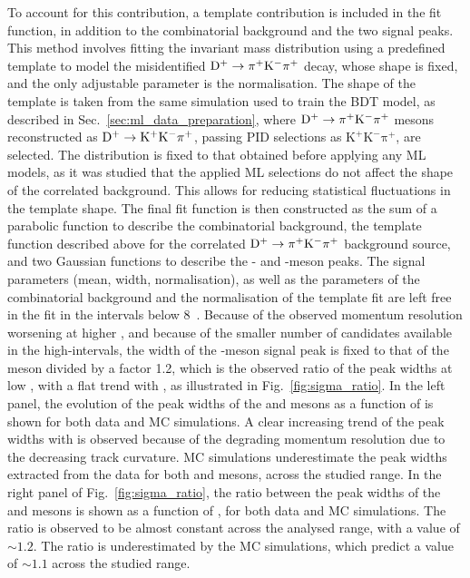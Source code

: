 To account for this contribution, a template contribution is included in the fit function, in addition to the combinatorial background and the two signal peaks. This method involves fitting the invariant mass distribution using a predefined template to model the misidentified $\mathrm{D^+}\rightarrow\mathrm{\pi^+K^-\pi^+}$ decay, whose shape is fixed, and the only adjustable parameter is the normalisation. The shape of the template is taken from the same simulation used to train the BDT model, as described in Sec.~\ref{sec:ml_data_preparation}, where $\mathrm{D^+}\rightarrow\mathrm{\pi^+K^-\pi^+}$ mesons reconstructed as $\mathrm{D^+}\rightarrow\mathrm{K^+K^-\pi^+}$, passing PID selections as $\mathrm{K^+K^-\pi^+}$, are selected. The distribution is fixed to that obtained before applying any ML models, as it was studied that the applied ML selections do not affect the shape of the correlated background. This allows for reducing statistical fluctuations in the template shape. The final fit function is then constructed as the sum of a parabolic function to describe the combinatorial background, the template function described above for the correlated $\mathrm{D^+}\rightarrow\mathrm{\pi^+K^-\pi^+}$ background source, and two Gaussian functions to describe the \ds- and \dpl-meson peaks. The signal parameters (mean, width, normalisation), as well as the parameters of the combinatorial background and the normalisation of the template fit are left free in the fit in the \pt intervals below 8~\gevc. Because of the observed momentum resolution worsening at higher \pt, and because of the smaller number of candidates available in the high-\pt intervals, the width of the \dpl-meson signal peak is fixed to that of the \ds meson divided by a factor 1.2, which is the observed ratio of the peak widths at low \pt, with a flat trend with \pt, as illustrated in Fig.~\ref{fig:sigma_ratio}. In the left panel, the evolution of the peak widths of the \ds and \dpl mesons as a function of \pt is shown for both data and MC simulations. A clear increasing trend of the peak widths with \pt is observed because of the degrading momentum resolution due to the decreasing track curvature. MC simulations underestimate the peak widths extracted from the data for both \ds and \dpl mesons, across the studied \pt range. In the right panel of Fig.~\ref{fig:sigma_ratio}, the ratio between the peak widths of the \ds and \dpl mesons is shown as a function of \pt, for both data and MC simulations. The ratio is observed to be almost constant across the analysed \pt range, with a value of $\sim 1.2$. The ratio is underestimated by the MC simulations, which predict a value of $\sim 1.1$ across the studied \pt range.

